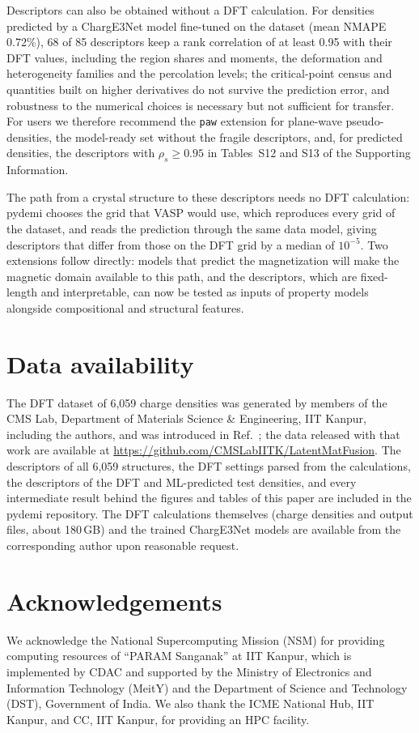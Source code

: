 \documentclass[11pt,a4paper]{article}
\begin{document}
Descriptors can also be obtained without a DFT calculation. For densities
predicted by a ChargE3Net model fine-tuned on the dataset (mean NMAPE
0.72\%), 68 of 85 descriptors keep a rank correlation of at least 0.95 with
their DFT values, including the region shares and moments, the deformation
and heterogeneity families and the percolation levels; the critical-point
census and quantities built on higher derivatives do not survive the
prediction error, and robustness to the numerical choices is necessary but
not sufficient for transfer. For users we therefore recommend the
\texttt{paw} extension for plane-wave pseudo-densities, the model-ready set
without the fragile descriptors, and, for predicted densities, the
descriptors with $\rho_s\geq0.95$ in Tables~S12 and S13 of the Supporting
Information.

The path from a crystal structure to these descriptors needs no DFT
calculation: pydemi chooses the grid that VASP would use, which reproduces
every grid of the dataset, and reads the prediction through the same data
model, giving descriptors that differ from those on the DFT grid by a median
of $10^{-5}$.
Two extensions follow directly: models that predict the magnetization will
make the magnetic domain available to this path, and the descriptors, which
are fixed-length and interpretable, can now be tested as inputs of property
models alongside compositional and structural features.

\section*{Data availability}
The DFT dataset of 6,059 charge densities was generated by members of the CMS
Lab, Department of Materials Science \& Engineering, IIT Kanpur, including the
authors, and was introduced in Ref.~\cite{kumar2026}; the data released with
that work are available at \url{https://github.com/CMSLabIITK/LatentMatFusion}.
The descriptors of all 6,059 structures, the DFT settings parsed from
the calculations, the descriptors of the DFT and ML-predicted test densities,
and every intermediate result behind the figures and tables of this paper are
included in the pydemi repository. The DFT calculations themselves
(charge densities and output files, about 180\,GB) and the trained ChargE3Net models are available from the
corresponding author upon reasonable request.

\section*{Acknowledgements}
We acknowledge the National Supercomputing Mission (NSM) for providing
computing resources of ``PARAM Sanganak'' at IIT Kanpur, which is implemented
by CDAC and supported by the Ministry of Electronics and Information Technology
(MeitY) and the Department of Science and Technology (DST), Government of
India. We also thank the ICME National Hub, IIT Kanpur, and CC, IIT Kanpur, for
providing an HPC facility.



\end{document}
